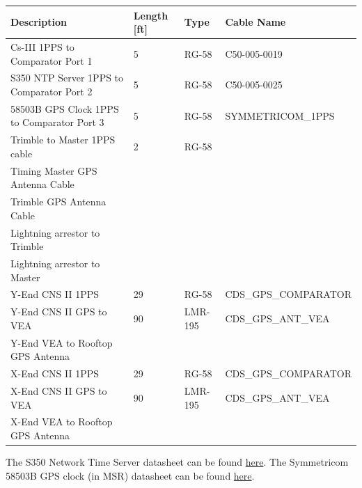 \documentclass{article}
\begin{document}
\begin{center}
  \label{table:lho-cables}
  \begin{tabular}{ | l | l | l | l | }
    \hline
    \textbf{Description}  			            & \textbf{Length [ft]} 	& \textbf{Type} & \textbf{Cable Name} \\ \hline
    Cs-III 1PPS to Comparator Port 1            & 5 					& RG-58			& C50-005-0019 \\ \hline
    S350 NTP Server 1PPS to Comparator Port 2   & 5 					& RG-58			& C50-005-0025 \\ \hline
    58503B GPS Clock 1PPS to Comparator Port 3  & 5 					& RG-58			& SYMMETRICOM\_1PPS \\ \hline
    Trimble to Master 1PPS cable	            & 2 					& RG-58			& \\ \hline
    Timing Master GPS Antenna Cable	            &  						& 				& \\ \hline
    Trimble GPS Antenna Cable                   &  						& 				& \\ \hline
    Lightning arrestor to Trimble               &  						& 				& \\ \hline
    Lightning arrestor to Master                &  						& 				& \\ \hline
    Y-End CNS II 1PPS  				            & 29 					& RG-58 		& CDS\_GPS\_COMPARATOR \\ \hline
    Y-End CNS II GPS to VEA                     & 90					& LMR-195		& CDS\_GPS\_ANT\_VEA \\ \hline
    Y-End VEA to Rooftop GPS Antenna            &                       &               & \\ \hline
    X-End CNS II 1PPS				            & 29					& RG-58			& CDS\_GPS\_COMPARATOR \\ \hline
    X-End CNS II GPS to VEA                     & 90					& LMR-195		& CDS\_GPS\_ANT\_VEA \\ \hline
    X-End VEA to Rooftop GPS Antenna            &                       &               & \\
    \hline
  \end{tabular}
\end{center}

The S350 Network Time Server datasheet can be found \href{https://www.microsemi.com/document-portal/doc_view/133759-syncserver-s350-network-time-server-datasheet}{here}. The Symmetricom 58503B GPS clock (in MSR) datasheet can be found \href{https://accusrc.com/uploads/datasheets/4975_58503b.pdf}{here}.
\end{document}
